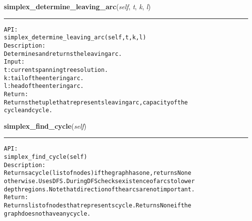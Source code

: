     \label{coinor:gimpy:graph:Graph:simplex_determine_leaving_arc}

    \vspace{0.5ex}

\hspace{.8\funcindent}\begin{boxedminipage}{\funcwidth}

    \raggedright \textbf{simplex\_determine\_leaving\_arc}(\textit{self}, \textit{t}, \textit{k}, \textit{l})

    \vspace{-1.5ex}

    \rule{\textwidth}{0.5\fboxrule}
\setlength{\parskip}{2ex}
\begin{alltt}

API:
    simplex\_determine\_leaving\_arc(self, t, k, l)
Description:
    Determines and returns the leaving arc.
Input:
    t: current spanning tree solution.
    k: tail of the entering arc.
    l: head of the entering arc.
Return:
    Returns the tuple that represents leaving arc, capacity of the
    cycle and cycle.
\end{alltt}

\setlength{\parskip}{1ex}
    \end{boxedminipage}

    \label{coinor:gimpy:graph:Graph:simplex_find_cycle}

    \vspace{0.5ex}

\hspace{.8\funcindent}\begin{boxedminipage}{\funcwidth}

    \raggedright \textbf{simplex\_find\_cycle}(\textit{self})

    \vspace{-1.5ex}

    \rule{\textwidth}{0.5\fboxrule}
\setlength{\parskip}{2ex}
\begin{alltt}

API:
    simplex\_find\_cycle(self)
Description:
    Returns a cycle (list of nodes) if the graph has one, returns None
    otherwise. Uses DFS. During DFS checks existence of arcs to lower
    depth regions. Note that direction of the arcs are not important.
Return:
    Returns list of nodes that represents cycle. Returns None if the
    graph does not have any cycle.
\end{alltt}

\setlength{\parskip}{1ex}
    \end{boxedminipage}


